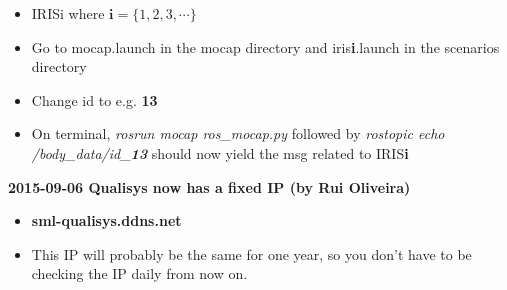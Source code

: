 \begin{itemize}
	
	\item IRISi where $\textbf{i} = \{1,2,3, \cdots\}$

	\item Go to mocap.launch in the mocap directory and iris\textbf{i}.launch in the scenarios directory
	
	\item Change id to e.g. \textbf{13} 
	
	\item On terminal, \textit{rosrun mocap ros\_mocap.py} followed by \textit{rostopic echo /body\_data/id\_\textbf{13}} should now yield the msg related to IRIS\textbf{i} 
\end{itemize}


\vspace{1cm}

\textbf{2015-09-06 Qualisys now has a fixed IP (by Rui Oliveira)}

\begin{itemize}
	\item \textbf{sml-qualisys.ddns.net}
	\item This IP will probably be the same for one year, so you don't have to be checking the IP daily from now on.
\end{itemize}
